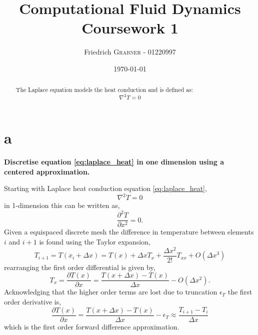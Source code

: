 \documentclass[10pt, a4paper]{article}
\title{Computational Fluid Dynamics \\ Coursework 1} %
\author{Friedrich \textsc{Grabner} - 01220997} %
\date{\today} %
\begin{document}
\maketitle %

\begin{abstract}
The Laplace equation models the heat conduction and is defined as:
	\begin{equation}
	\nabla^2 T = 0
	\label{eq:laplace_heat}
	\end{equation}
\end{abstract}

\section*{a}
\textbf{Discretise  equation  \ref{eq:laplace_heat}  in  one  dimension  using  a  centered  approximation.}

Starting with Laplace heat conduction equation \ref{eq:laplace_heat},
\begin{equation}
\nabla^2 T = 0
\label{eq:laplace_heat}
\end{equation}
in 1-dimension this can be written as,
\begin{equation}
\frac{\partial^2 T}{\partial x^2} = 0 .
\label{eq:partial_heat}
\end{equation}
Given a equispaced discrete mesh the difference in temperature between elements $i$ and $i + 1$ is found using the Taylor expansion,
\begin{equation}
T_{i + 1} = T(x_i + \Delta x) = T(x) + \Delta x T_{x} + \frac{\Delta x^2}{2!} T_{xx} + O(\Delta x^3)
\end{equation}
rearranging the first order differential is given by,
\begin{equation}
T_{x} = \frac{\partial T(x)}{\partial x} = \frac{T(x + \Delta x) - T(x)}{\Delta x} - O(\Delta x^2)  . 
\end{equation}
Acknowledging that the higher order terms are lost due to truncation $\epsilon_T$ the first order derivative is,
\begin{equation}
\frac{\partial T(x)}{\partial x} = \frac{T(x + \Delta x) - T(x)}{\Delta x} - \epsilon_T \approx \frac{T_{i+1} - T_i}{\Delta x}
\end{equation}
which is the first order forward difference approximation.
\end{document}
